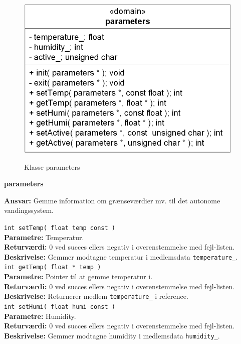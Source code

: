 
\begin{figure}[htbp] \centering
{\includegraphics[scale=1.3]{filer/design/Klassediagrammer/sw_psoc_parameters}}
\caption{Klasse parameters}
\label{fig:sw_psoc_class_parameters}
\end{figure} 

{\centering
\textbf{parameters}\par
}
\textbf{Ansvar:} Gemme information om grænseværdier mv. til det autonome vandingssystem. \

\verb+int setTemp( float temp const ) +\\
\textbf{Parametre:} Temperatur. \\
\textbf{Returværdi:} 0 ved succes ellers negativ i overenstemmelse med fejl-listen. \\
\textbf{Beskrivelse:} Gemmer modtagne temperatur i medlemsdata \verb+temperature_+. \\

\verb+int getTemp( float * temp )+ \\
\textbf{Parametre:} Pointer til at gemme temperatur i. \\
\textbf{Returværdi:} 0 ved succes ellers negativ i overenstemmelse med fejl-listen. \\
\textbf{Beskrivelse:} Returnerer medlem \verb+temperature_+ i reference. \\

\verb+int setHumi( float humi const )+ \\
\textbf{Parametre:} Humidity. \\
\textbf{Returværdi:} 0 ved succes ellers negativ i overenstemmelse med fejl-listen. \\
\textbf{Beskrivelse:} Gemmer modtagne humidity i medlemsdata \verb+humidity_+. \\

